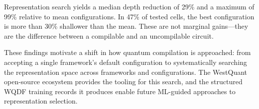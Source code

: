 \documentclass[11pt,a4paper]{article}
\begin{document}
Representation search yields a median depth reduction of 29\% and a maximum of 99\% relative to mean configurations. In 47\% of tested cells, the best configuration is more than 30\% shallower than the mean. These are not marginal gains---they are the difference between a compilable and an uncompilable circuit.

These findings motivate a shift in how quantum compilation is approached: from accepting a single framework's default configuration to systematically searching the representation space across frameworks and configurations. The WestQuant open-source ecosystem provides the tooling for this search, and the structured WQDF training records it produces enable future ML-guided approaches to representation selection.

\end{document}
